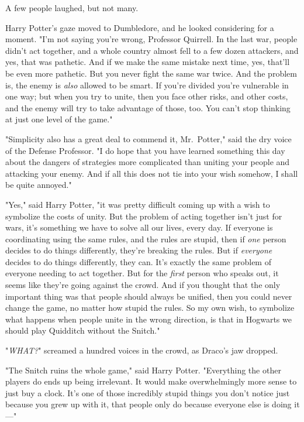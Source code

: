 A few people laughed, but not many.

Harry Potter's gaze moved to Dumbledore, and he looked considering for a 
moment. "I'm not saying you're wrong, Professor Quirrell. In the last war, 
people didn't act together, and a whole country almost fell to a few dozen 
attackers, and yes, that was pathetic. And if we make the same mistake next 
time, yes, that'll be even more pathetic. But you never fight the same war 
twice. And the problem is, the enemy is \emph{also} allowed to be smart. If 
you're divided you're vulnerable in one way; but when you try to unite, then 
you face other risks, and other costs, and the enemy will try to take advantage 
of those, too. You can't stop thinking at just one level of the game."

"Simplicity also has a great deal to commend it, Mr.~Potter," said the dry 
voice of the Defense Professor. "I do hope that you have learned something this 
day about the dangers of strategies more complicated than uniting your people 
and attacking your enemy. And if all this does not tie into your wish somehow, 
I shall be quite annoyed."

"Yes," said Harry Potter, "it was pretty difficult coming up with a wish to 
symbolize the costs of unity. But the problem of acting together isn't just for 
wars, it's something we have to solve all our lives, every day. If everyone is 
coordinating using the same rules, and the rules are stupid, then if \emph{one} 
person decides to do things differently, they're breaking the rules. But if 
\emph{everyone} decides to do things differently, they can. It's exactly the 
same problem of everyone needing to act together. But for the \emph{first} 
person who speaks out, it seems like they're going against the crowd. And if 
you thought that the only important thing was that people should always be 
unified, then you could never change the game, no matter how stupid the rules. 
So my own wish, to symbolize what happens when people unite in the wrong 
direction, is that in Hogwarts we should play Quidditch without the Snitch."

"\emph{WHAT?}" screamed a hundred voices in the crowd, as Draco's jaw dropped.

"The Snitch ruins the whole game," said Harry Potter. "Everything the other 
players do ends up being irrelevant. It would make overwhelmingly more sense to 
just buy a clock. It's one of those incredibly stupid things you don't notice 
just because you grew up with it, that people only do because everyone else is 
doing it---"

